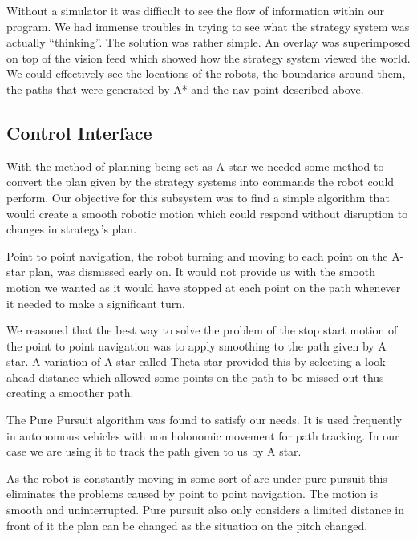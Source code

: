 
Without a simulator it was difficult to see the flow of information within our program. 
We had immense troubles in trying to see what the strategy system was actually “thinking”.
The solution was rather simple. An overlay was superimposed on top of the vision feed which 
showed how the strategy system viewed the world. We could effectively see the locations of 
the robots, the boundaries around them, the paths that were generated by A* and the 
nav-point described above. 


\subsection{Control Interface}

With the method of planning being set as A-star we needed some method to
convert the plan given by the strategy systems into commands the robot could
perform. Our objective for this subsystem was to find a simple algorithm that
would create a smooth robotic motion which could respond without disruption to
changes in strategy's plan.

Point to point navigation, the robot turning and moving to each point on the
A-star plan, was dismissed early on. It would not provide us with the smooth
motion we wanted as it would have stopped at each point on the path whenever it
needed to make a significant turn.

We reasoned that the best way to solve the problem of the stop start motion of
the point to point navigation was to apply smoothing to the path given by
A star. A variation of A star called Theta star provided this by selecting
a look-ahead distance which allowed some points on the path to be missed out
thus creating a smoother path.

The Pure Pursuit algorithm was found to satisfy our needs. It is used
frequently in autonomous vehicles with non holonomic
movement for path tracking\cite{agvpp}\cite{coulterpp}. In our case we are
using it to track the path given to us by A star.

As the robot is constantly moving in some sort of arc under pure pursuit this
eliminates the problems caused by point to point navigation. The motion is
smooth and uninterrupted. Pure pursuit also only considers a limited distance
in front of it the plan can be changed as the situation on the pitch changed.

